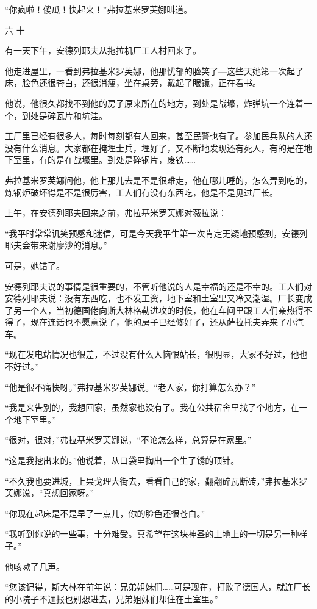 “你疯啦！傻瓜！快起来！”弗拉基米罗芙娜叫道。

六 十

有一天下午，安德列耶夫从拖拉机厂工人村回来了。

他走进屋里，一看到弗拉基米罗芙娜，他那忧郁的脸笑了—这些天她第一次起了床，脸色还很苍白，还很消瘦，坐在桌旁，戴起了眼镜，正在看书。

他说，他很久都找不到他的房子原来所在的地方，到处是战壕，炸弹坑一个连着一个，到处是碎瓦片和坑洼。

工厂里已经有很多人，每时每刻都有人回来，甚至民警也有了。参加民兵队的人还没有什么消息。大家都在掩埋士兵，埋好了，又不断地发现还有死人，有的是在地下室里，有的是在战壕里。到处是碎钢片，废铁……

弗拉基米罗芙娜问他，他上那儿去是不是很难走，他在哪儿睡的，怎么弄到吃的，炼钢炉破坏得是不是很厉害，工人们有没有东西吃，他是不是见过厂长。

上午，在安德列耶夫回来之前，弗拉基米罗芙娜对薇拉说：

“我平时常常讥笑预感和迷信，可是今天我平生第一次肯定无疑地预感到，安德列耶夫会带来谢廖沙的消息。”

可是，她错了。

安德列耶夫说的事情是很重要的，不管听他说的人是幸福的还是不幸的。工人们对安德列耶夫说：没有东西吃，也不发工资，地下室和土室里又冷又潮湿。厂长变成了另一个人，当初德国佬向斯大林格勒进攻的时候，他在车间里跟工人们亲热得不得了，现在连话也不愿意说了，他的房子已经修好了，还从萨拉托夫弄来了小汽车。

“现在发电站情况也很差，不过没有什么人恼恨站长，很明显，大家不好过，他也不好过。”

“他是很不痛快呀。”弗拉基米罗芙娜说。“老人家，你打算怎么办？”

“我是来告别的，我想回家，虽然家也没有了。我在公共宿舍里找了个地方，在一个地下室里。”

“很对，很对，”弗拉基米罗芙娜说，“不论怎么样，总算是在家里。”

“这是我挖出来的。”他说着，从口袋里掏出一个生了锈的顶针。

“不久我也要进城，上果戈理大街去，看看自己的家，翻翻碎瓦断砖，”弗拉基米罗芙娜说，“真想回家呀。”

“你现在起床是不是早了一点儿，你的脸色还很苍白。”

“我听到你说的一些事，十分难受。真希望在这块神圣的土地上的一切是另一种样子。”

他咳嗽了几声。

“您该记得，斯大林在前年说：兄弟姐妹们……可是现在，打败了德国人，就连厂长的小院子不通报也别想进去，兄弟姐妹们却住在土室里。”

